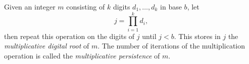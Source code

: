 \documentclass[12pt]{article}
\begin{document}
Given an integer $m$ consisting of $k$ digits $d_1, \dots, d_k$ in base $b$, let $$j = \prod_{i = 1}^{k} d_i,$$ then repeat this operation on the digits of $j$ until $j < b$. This stores in $j$ the {\em multiplicative digital root} of $m$. The number of iterations of the multiplication operation is called the {\em multiplicative persistence} of $m$.
\end{document}

